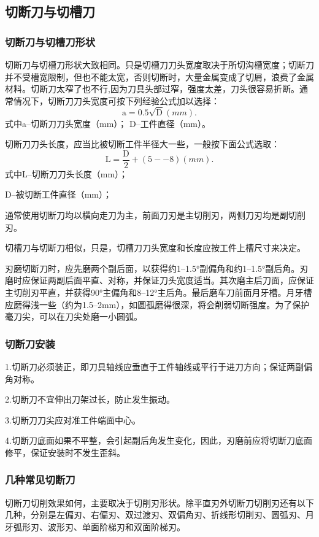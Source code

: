 \documentclass{ctexbook}
\begin{document}
\subsection{切断刀与切槽刀}
\subsubsection{切断刀与切槽刀形状}
切断刀与切槽刀形状大致相同。只是切槽刀刀头宽度取决于所切沟槽宽度；切断刀并不受槽宽限制，但也不能太宽，否则切断时，大量金属变成了切屑，浪费了金属材料。切断刀太窄了也不行,因为刀具头部过窄，强度太差，刀头很容易折断。通常情况下，切断刀刀头宽度可按下列经验公式加以选择：
\begin{equation*}
	\text{a}=0.5\sqrt{\text{D}} (mm).
\end{equation*}
式中a--切断刀刀头宽度（mm）；
D--工件直径（mm）。

切断刀刀头长度，应当比被切断工件半径大一些，一般按下面公式选取：
\begin{equation*}
	\text{L}=\frac{\text{D}}{2}+(5--8) (mm) .
\end{equation*}
式中L--切断刀刀头长度（mm）；

D--被切断工件直径（mm）；

通常使用切断刀均以横向走刀为主，前面刀刃是主切削刃，两侧刀刃均是副切削刃。

切槽刀与切断刀相似，只是，切槽刀刀头宽度和长度应按工件上槽尺寸来决定。

刃磨切断刀时，应先磨两个副后面，以获得约1--1.5°副偏角和约1--1.5°副后角。刃磨时应保证两副后面平直、对称，并保证刀头宽度适当。其次磨主后刀面，应保证主切削刃平直，并获得90°主偏角和8--12°主后角。最后磨车刀前面月牙槽。月牙槽应磨得浅一些（约为1.5--2mm），如圆孤磨得很深，将会削弱切断强度。为了保护毫刀尖，可以在刀尖处磨一小圆弧。
\subsubsection{切断刀安装}
1.切断刀必须装正，即刀具轴线应垂直于工件轴线或平行于进刀方向；保证两副偏角对称。

2.切断刀不宜伸出刀架过长，防止发生振动。

3.切断刀刀尖应对准工件端面中心。

4.切断刀底面如果不平整，会引起副后角发生变化，因此，刃磨前应将切断刀底面修平，保证安装时不发生歪斜。
\subsubsection{几种常见切断刀}
切断刀切削效果如何，主要取决于切削刃形状。除平直刃外切断刀切削刃还有以下几种，分别是左偏刃、右偏刃、双过渡刃、双偏角刃、折线形切削刃、圆弧刃、月牙弧形刃、波形刃、单面阶梯刃和双面阶梯刃。
\end{document}
